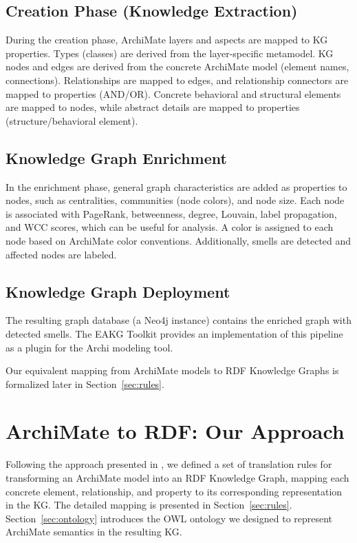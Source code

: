 \subsection{Creation Phase (Knowledge Extraction)}
\label{subsec:eakg-creation}

During the creation phase, ArchiMate layers and aspects are mapped to KG properties. Types (classes) are derived from the layer-specific metamodel. KG nodes and edges are derived from the concrete ArchiMate model (element names, connections). Relationships are mapped to edges, and relationship connectors are mapped to properties (AND/OR). Concrete behavioral and structural elements are mapped to nodes, while abstract details are mapped to properties (structure/behavioral element).

\subsection{Knowledge Graph Enrichment}
\label{subsec:eakg-enrichment}

In the enrichment phase, general graph characteristics are added as properties to nodes, such as centralities, communities (node colors), and node size. Each node is associated with PageRank, betweenness, degree, Louvain, label propagation, and WCC scores, which can be useful for analysis. A color is assigned to each node based on ArchiMate color conventions. Additionally, smells are detected and affected nodes are labeled.

\subsection{Knowledge Graph Deployment}
\label{subsec:eakg-deployment}

The resulting graph database (a Neo4j instance) contains the enriched graph with detected smells. The EAKG Toolkit \parencite{glaser2022toolkit} provides an implementation of this pipeline as a plugin for the Archi modeling tool.

Our equivalent mapping from ArchiMate models to RDF Knowledge Graphs is formalized later in Section~\ref{sec:rules}.

\section{ArchiMate to RDF: Our Approach}
\label{sec:rdf-approach}

Following the approach presented in \parencite{glaser2022model}, we defined a set of translation rules for transforming an ArchiMate model into an RDF Knowledge Graph, mapping each concrete element, relationship, and property to its corresponding representation in the KG. The detailed mapping is presented in Section~\ref{sec:rules}. Section~\ref{sec:ontology} introduces the OWL ontology we designed to represent ArchiMate semantics in the resulting KG.

